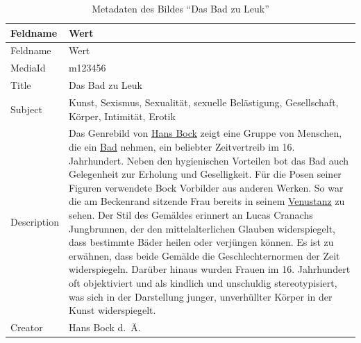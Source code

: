 \documentclass[
  nswissgerman,
  letterpaper,
  DIV=11,
  numbers=noendperiod]{scrartcl}
\begin{document}
\begin{longtable}[]{@{}
  >{\raggedright\arraybackslash}p{}
  >{\raggedright\arraybackslash}p{}@{}}
\caption{Metadaten des Bildes ``Das Bad zu
Leuk''}\label{tbl-metadaten-das-bad-zu-leuk}\tabularnewline
\toprule\noalign{}
\begin{minipage}[b]{\linewidth}\raggedright
Feldname
\end{minipage} & \begin{minipage}[b]{\linewidth}\raggedright
Wert
\end{minipage} \\
\midrule\noalign{}
\endfirsthead
\toprule\noalign{}
\begin{minipage}[b]{\linewidth}\raggedright
Feldname
\end{minipage} & \begin{minipage}[b]{\linewidth}\raggedright
Wert
\end{minipage} \\
\midrule\noalign{}
\endhead
\bottomrule\noalign{}
\endlastfoot
MediaId & m123456 \\
Title & Das Bad zu Leuk \\
Subject & Kunst, Sexismus, Sexualität, sexuelle Belästigung,
Gesellschaft, Körper, Intimität, Erotik \\
Description & Das Genrebild von
\href{https://hls-dhs-dss.ch/de/articles/019088/2002-11-07/}{Hans Bock}
zeigt eine Gruppe von Menschen, die ein
\href{https://hls-dhs-dss.ch/de/articles/016308/2017-05-04/\#HVondenAnfE4ngenbisindiefrFCheNeuzeit}{Bad}
nehmen, ein beliebter Zeitvertreib im 16. Jahrhundert. Neben den
hygienischen Vorteilen bot das Bad auch Gelegenheit zur Erholung und
Geselligkeit. Für die Posen seiner Figuren verwendete Bock Vorbilder aus
anderen Werken. So war die am Beckenrand sitzende Frau bereits in seinem
\href{https://stadtgeschichtebasel.ch/blog/1000-jahre-10-geschichten-skandal-goetzendienst-und-bilderstreit-im-basler-muenster}{Venustanz}
zu sehen. Der Stil des Gemäldes erinnert an Lucas Cranachs Jungbrunnen,
der den mittelalterlichen Glauben widerspiegelt, dass bestimmte Bäder
heilen oder verjüngen können. Es ist zu erwähnen, dass beide Gemälde die
Geschlechternormen der Zeit widerspiegeln. Darüber hinaus wurden Frauen
im 16. Jahrhundert oft objektiviert und als kindlich und unschuldig
stereotypisiert, was sich in der Darstellung junger, unverhüllter Körper
in der Kunst widerspiegelt. \\
Creator & Hans Bock d.~Ä.

\end{longtable}
\end{document}
